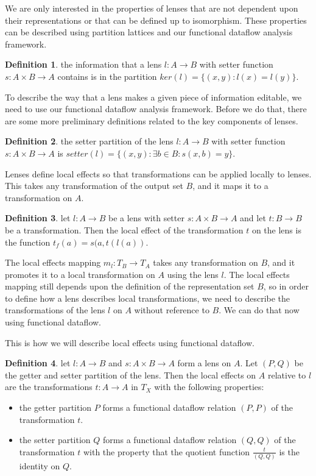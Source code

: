 \documentclass[a4paper,11pt, notitlepage]{report}
\theoremstyle{definition}
\newtheorem{definition}{Definition}[section]
\begin{document}
We are only interested in the properties of lenses that are not dependent upon their representations or that can be defined up to isomorphism. These properties can be described using partition lattices and our functional dataflow analysis framework.

\begin{definition}
the information that a lens $l : A \to B$ with setter function $s : A \times B \to A$ contains is in the partition $ker(l) = \{(x,y) : l(x) = l(y)\}$.
\end{definition}

To describe the way that a lens makes a given piece of information editable, we need to use our functional dataflow analysis framework. Before we do that, there are some more preliminary definitions related to the key components of lenses.

\begin{definition}
the setter partition of the lens $l : A \to B$ with setter function $s : A \times B \to A$ is $setter(l) = \{(x,y) : \exists b \in B : s(x,b) = y \}$.
\end{definition}

Lenses define local effects so that transformations can be applied locally to lenses. This takes any transformation of the output set $B$, and it maps it to a transformation on $A$.

\begin{definition}
let $l: A \to B$ be a lens with setter $s: A \times B \to A$ and let $t : B \to B$ be a transformation. Then the local effect of the transformation $t$ on the lens is the function $t_f(a) = s(a,t(l(a))$.
\end{definition}

The local effects mapping $m_l: T_B \to T_A$ takes any transformation on $B$, and it promotes it to a local transformation on $A$ using the lens $l$. The local effects mapping still depends upon the definition of the representation set $B$, so in order to define how a lens describes local transformations, we need to describe the transformations of the lens $l$ on $A$ without reference to $B$. We can do that now using functional dataflow.

\newpage

This is how we will describe local effects using functional dataflow.

\begin{definition}
let $l: A \to B$ and $s: A \times B \to A$ form a lens on $A$. Let $(P,Q)$ be the getter and setter partition of the lens. Then the local effects on $A$ relative to $l$ are the transformations $t: A \to A$ in $T_X$ with the following properties:

\begin{itemize}
 \item the getter partition $P$ forms a functional dataflow relation $(P,P)$ of the transformation $t$.
 \item the setter partition $Q$ forms a functional dataflow relation $(Q,Q)$ of the transformation $t$ with the property that the quotient function $\frac{t}{(Q,Q)}$ is the identity on $Q$.
\end{itemize}
\end{definition}
\end{document}
